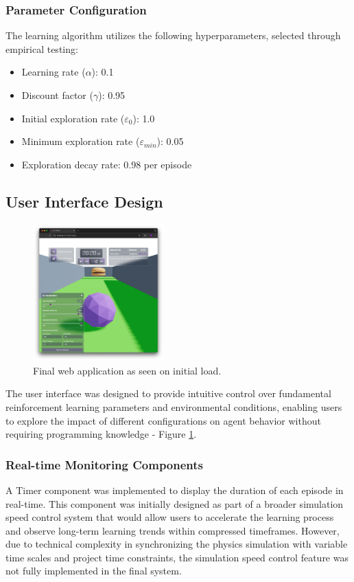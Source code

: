 \subsubsection{Parameter Configuration}
The learning algorithm utilizes the following hyperparameters, selected through empirical testing:
\begin{itemize}
    \item Learning rate ($\alpha$): 0.1
    \item Discount factor ($\gamma$): 0.95
    \item Initial exploration rate ($\varepsilon_0$): 1.0
    \item Minimum exploration rate ($\varepsilon_{min}$): 0.05
    \item Exploration decay rate: 0.98 per episode
\end{itemize}

\subsection{User Interface Design}

\begin{figure}[htbp]
    \centering
    \includegraphics[width=0.45\textwidth]
    {figures/rl_racing_main.png}
    \caption{Final web application as seen on initial load.}
    \label{fig:rl_racing_main}
\end{figure}

The user interface was designed to provide intuitive control over fundamental reinforcement learning parameters and environmental conditions, enabling users to explore the impact of different configurations on agent behavior without requiring programming knowledge - Figure \ref{fig:rl_racing_main}.

\subsubsection{Real-time Monitoring Components}
A Timer component was implemented to display the duration of each episode in real-time. This component was initially designed as part of a broader simulation speed control system that would allow users to accelerate the learning process and observe long-term learning trends within compressed timeframes. However, due to technical complexity in synchronizing the physics simulation with variable time scales and project time constraints, the simulation speed control feature was not fully implemented in the final system.

